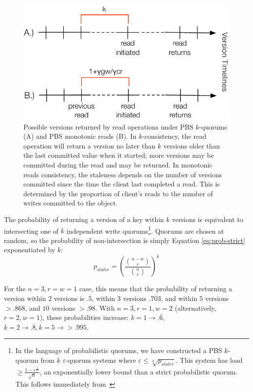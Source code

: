 \documentclass{vldb}
\begin{document}
\begin{figure}
\centering
\includegraphics[width=\columnwidth]{figs/timelines.pdf}
\caption{Possible versions returned by read operations under
  PBS $k$-quorums (A) and PBS monotonic reads (B). In
  $k$-consistency, the read operation will return a version no later
  than $k$ versions older than the last committed value when it
  started; more versions may be committed during the read and may be
  returned.  In monotonic reads consistency, the staleness depends on
  the number of versions committed since the time the client last
  completed a read.  This is determined by the proportion of client's
  reads to the number of writes committed to the object.}
\label{fig:timelines}
\end{figure}

The probability of returning a version of a key within $k$ versions is
equivalent to intersecting one of $k$ independent write
quorums\footnote{In the language of probabilistic quorums, we have
  constructed a PBS $k$-quorum from $k$ $\varepsilon$-quorum
  systems where $\varepsilon \leq \sqrt[k]{p_{staler}}$. This system
  has load $\geq \frac{1-\varepsilon^{\frac{1}{2k}}}{\sqrt{n}}$, an
  exponentially lower bound than a strict probabilistic quorum.  This
  follows immediately from~\cite[Corollary 3.12]{prob-quorum}}.
Quorums are chosen at random, so the probability of non-intersection
is simply Equation \ref{eq:prob-strict} exponentiated by $k$:
\begin{equation}
\label{eq:k-consistency}
p_{staler} = \left(\frac{{n-w \choose r}}{{n \choose r}}\right)^k
\end{equation}

For the $n=3, r=w=1$ case, this means that the probability of
returning a version within $2$ versions is $.\overline{5}$, within $3$
versions $.\overline{703}$, and within $5$ versions $> .868$, and $10$
versions $>.98$.  With $n=3, r=1, w=2$ (alternatively, $r=2, w=1$),
these probabilities increase: $k=1 \rightarrow
.\overline{6}$, $k=2 \rightarrow .\overline{8}, k=5 \rightarrow >
.995$.
\end{document}
